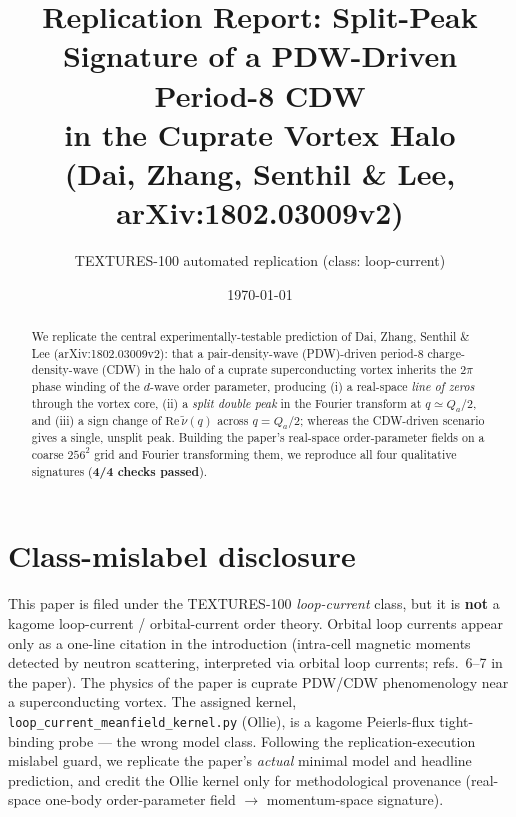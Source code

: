\documentclass[11pt]{article}
\title{Replication Report: Split-Peak Signature of a PDW-Driven Period-8 CDW\\
in the Cuprate Vortex Halo\\ \large (Dai, Zhang, Senthil \& Lee, arXiv:1802.03009v2)}
\author{TEXTURES-100 automated replication (class: loop-current)}
\date{\today}
\begin{document}
\maketitle

\begin{abstract}
We replicate the central experimentally-testable prediction of Dai, Zhang,
Senthil \& Lee (arXiv:1802.03009v2): that a pair-density-wave (PDW)-driven
period-8 charge-density-wave (CDW) in the halo of a cuprate superconducting
vortex inherits the $2\pi$ phase winding of the $d$-wave order parameter,
producing (i) a real-space \emph{line of zeros} through the vortex core,
(ii) a \emph{split double peak} in the Fourier transform at $q\simeq Q_a/2$,
and (iii) a sign change of $\mathrm{Re}\,\tilde\nu(q)$ across $q=Q_a/2$; whereas
the CDW-driven scenario gives a single, unsplit peak. Building the paper's
real-space order-parameter fields on a coarse $256^2$ grid and Fourier
transforming them, we reproduce all four qualitative signatures
(\textbf{4/4 checks passed}).
\end{abstract}

\section{Class-mislabel disclosure}
This paper is filed under the TEXTURES-100 \emph{loop-current} class, but it is
\textbf{not} a kagome loop-current / orbital-current order theory. Orbital loop
currents appear only as a one-line citation in the introduction (intra-cell
magnetic moments detected by neutron scattering, interpreted via orbital loop
currents; refs.~6--7 in the paper). The physics of the paper is cuprate
PDW/CDW phenomenology near a superconducting vortex. The assigned kernel,
\texttt{loop\_current\_meanfield\_kernel.py} (Ollie), is a kagome Peierls-flux
tight-binding probe --- the wrong model class. Following the replication-execution
mislabel guard, we replicate the paper's \emph{actual} minimal model and headline
prediction, and credit the Ollie kernel only for methodological provenance
(real-space one-body order-parameter field $\to$ momentum-space signature).
\end{document}
